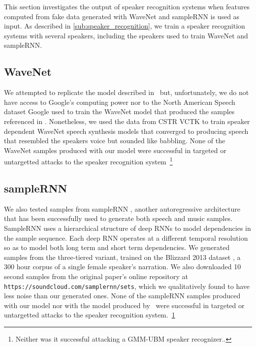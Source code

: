 This section investigates the output of speaker recognition systems when
features computed from fake data generated with WaveNet and sampleRNN is used as
input. As described in \ref{sub:speaker_recognition}, we train a speaker
recognition systems with several speakers, including the speakers used to train
WaveNet and sampleRNN. 

\subsection{WaveNet} %
\label{sub:res-WaveNet}
We attempted to replicate the model described in~\cite{van2016wavenet} but,
unfortunately, we do not have access to Google's computing power nor to the
North American Speech dataset Google used to train the WaveNet model that
produced the samples referenced in \cite{van2016wavenet}. Nonetheless, we used
the data from CSTR VCTK to train speaker dependent WaveNet speech synthesis
models that converged to producing speech that resembled the speakers voice but
sounded like babbling. None of the WaveNet samples produced with our model were
successful in targeted or untargetted attacks to the speaker recognition
system~\footnote{Neither was it successful attacking a GMM-UBM speaker
recognizer.\label{foot:gmm_ubm}.}
\subsection{sampleRNN} %
\label{sub:samplernn}
We also tested samples from sampleRNN \cite{mehri2016samplernn}, another
autoregressive architecture that has been successfully used to generate both
speech and music samples. SampleRNN uses a hierarchical structure of deep RNNs
to model dependencies in the sample sequence. Each deep RNN operates at a
different temporal resolution so as to model both long term and short term
dependencies. We generated samples from the three-tiered variant, trained on the
Blizzard 2013 dataset \cite{prahallad2013blizzard}, a 300 hour corpus of a
single female speaker's narration. We also downloaded 10 second samples from the
original paper's online repository at
\texttt{https://soundcloud.com/samplernn/sets}, which we qualitatively found to
have less noise than our generated ones. None of the sampleRNN samples produced
with our model nor with the model produced by~\cite{mehri2016samplernn} were
successful in targeted or untargetted attacks to the speaker recognition
system.~\ref{foot:gmm_ubm}
